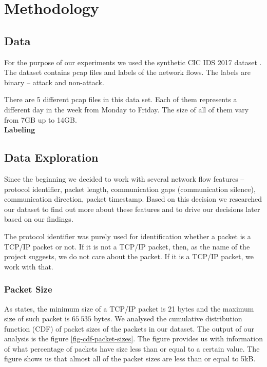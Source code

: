 \documentclass{article}
\begin{document}
\section{Methodology}
\subsection{Data}
For the purpose of our experiments we used the synthetic CIC IDS 2017 dataset \cite{sharafaldin2018toward}. The dataset contains pcap files and labels of the network flows. The labels are binary -- attack and non-attack.

There are 5 different pcap files in this data set. Each of them represents a different day in the week from Monday to Friday. The size of all of them vary from 7GB up to 14GB.\\

\noindent\textbf{Labeling}\\


\subsection{Data Exploration}\label{sec-dataset-exploration}
Since the beginning we decided to work with several network flow features -- protocol identifier, packet length, communication gaps (communication silence), communication direction, packet timestamp. Based on this decision we researched our dataset to find out more about these features and to drive our decisions later based on our findings.

The protocol identifier was purely used for identification whether a packet is a TCP/IP packet or not. If it is not a TCP/IP packet, then, as the name of the project suggests, we do not care about the packet. If it is a TCP/IP packet, we work with that.

\subsubsection{Packet Size}
As \cite{oreilly-tcp} states, the minimum size of a TCP/IP packet is 21 bytes and the maximum size of such packet is $65\ 535$ bytes. We analysed the cumulative distribution function (CDF) of packet sizes of the packets in our dataset. The output of our analysis is the figure \ref{fig-cdf-packet-sizes}. The figure provides us with information of what percentage of packets have size less than or equal to a certain value. The figure shows us that almost all of the packet sizes are less than or equal to 5kB.
\end{document}
